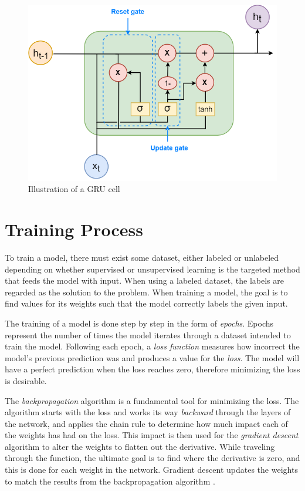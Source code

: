 \documentclass[nofilelist]{cslthse-msc}
\begin{document}
\begin{figure}[!ht]
    \centering
    \includegraphics[scale=0.58]{msccls/explanatory_images/gru.png}
    \caption{Illustration of a GRU cell}
    \label{fig:gru_node}
\end{figure}


\section{Training Process}
To train a model, there must exist some dataset, either labeled or unlabeled depending on whether supervised or unsupervised learning is the targeted method that feeds the model with input. When using a labeled dataset, the labels are regarded as the solution to the problem. When training a model, the goal is to find values for its weights such that the model correctly labels the given input. 

The training of a model is done step by step in the form of \textit{epochs}. Epochs represent the number of times 
the model iterates through a dataset intended to train the model. Following each epoch, a \textit{loss function} measures how incorrect the model's previous prediction was and produces a value for the \textit{loss}. The model will have a perfect prediction when the loss reaches zero, therefore minimizing the loss is desirable. 

The \textit{backpropagation} algorithm is a fundamental tool for minimizing the loss. The algorithm starts with the loss and works its way \textit{backward} through the layers of the network, and applies the chain rule to determine how much impact each of the weights has had on the loss. This impact is then used for the \textit{gradient descent} algorithm to alter the weights to flatten out the derivative. While traveling through the function, the ultimate goal is to find where the derivative is zero, and this is done for each weight in the network. Gradient descent updates the weights to match the results from the backpropagation algorithm \citep{franoischollet2017learning}. 
\end{document}
